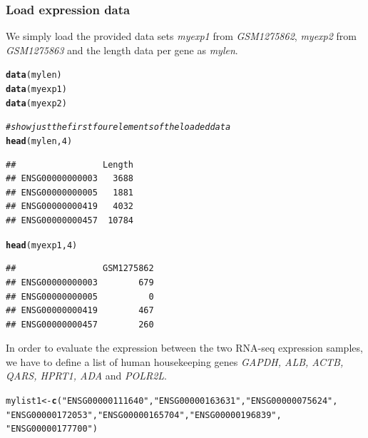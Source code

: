 \documentclass[11pt]{article}\usepackage[]{graphicx}\usepackage[usenames,dvipsnames]{color}
\makeatletter
\newcommand{\hlnum}[1]{\textcolor[rgb]{0.686,0.059,0.569}{#1}}%
\newcommand{\hlstr}[1]{\textcolor[rgb]{0.192,0.494,0.8}{#1}}%
\newcommand{\hlcom}[1]{\textcolor[rgb]{0.678,0.584,0.686}{\textit{#1}}}%
\newcommand{\hlstd}[1]{\textcolor[rgb]{0.345,0.345,0.345}{#1}}%
\newcommand{\hlkwb}[1]{\textcolor[rgb]{0.69,0.353,0.396}{#1}}%
\newcommand{\hlkwd}[1]{\textcolor[rgb]{0.737,0.353,0.396}{\textbf{#1}}}%
\newenvironment{kframe}{%
 \def\at@end@of@kframe{}%
 \ifinner\ifhmode%
  \def\at@end@of@kframe{\end{minipage}}%
  \begin{minipage}{\columnwidth}%
 \fi\fi%
 \def\FrameCommand##1{\hskip\@totalleftmargin \hskip-\fboxsep
 \colorbox{shadecolor}{##1}\hskip-\fboxsep
     \hskip-\linewidth \hskip-\@totalleftmargin \hskip\columnwidth}%
 \MakeFramed {\advance\hsize-\width
   \@totalleftmargin\z@ \linewidth\hsize
   \@setminipage}}%
 {\par\unskip\endMakeFramed%
 \at@end@of@kframe}
\newenvironment{knitrout}{}{} %
\makeatother
\begin{document}
\subsubsection{Load expression data} \label{sec:loaddata}

We simply load the provided data sets \textit{myexp1} from \textit{GSM1275862}, \textit{myexp2} from \textit{GSM1275863} and the length data per gene as \textit{mylen}.

\begin{knitrout}
\color{fgcolor}\begin{kframe}
\begin{alltt}
\hlkwd{data}\hlstd{(mylen)}
\hlkwd{data}\hlstd{(myexp1)}
\hlkwd{data}\hlstd{(myexp2)}

\hlcom{#show just the first four elements of the loaded data}
\hlkwd{head}\hlstd{(mylen,}\hlnum{4}\hlstd{)}
\end{alltt}
\begin{verbatim}
##                 Length
## ENSG00000000003   3688
## ENSG00000000005   1881
## ENSG00000000419   4032
## ENSG00000000457  10784
\end{verbatim}
\begin{alltt}
\hlkwd{head}\hlstd{(myexp1,}\hlnum{4}\hlstd{)}
\end{alltt}
\begin{verbatim}
##                 GSM1275862
## ENSG00000000003        679
## ENSG00000000005          0
## ENSG00000000419        467
## ENSG00000000457        260
\end{verbatim}
\end{kframe}
\end{knitrout}

In order to evaluate the expression between the two RNA-seq expression samples, we have to define a list of human housekeeping genes \textit{GAPDH, ALB, ACTB, QARS, HPRT1, ADA} and \textit{POLR2L}.

\begin{knitrout}
\color{fgcolor}\begin{kframe}
\begin{alltt}
\hlstd{mylist1}\hlkwb{<-}\hlkwd{c}\hlstd{(}\hlstr{"ENSG00000111640"}\hlstd{,}\hlstr{"ENSG00000163631"}\hlstd{,}\hlstr{"ENSG00000075624"}\hlstd{,}
           \hlstr{"ENSG00000172053"}\hlstd{,}\hlstr{"ENSG00000165704"}\hlstd{,}\hlstr{"ENSG00000196839"}\hlstd{,}
           \hlstr{"ENSG00000177700"}\hlstd{)}
\end{alltt}
\end{kframe}
\end{knitrout}
\end{document}

